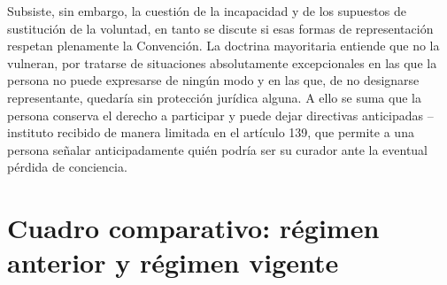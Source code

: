 \documentclass[12pt,oneside]{book}
\begin{document}
Subsiste, sin embargo, la cuestión de la incapacidad y de los supuestos de sustitución de la voluntad, en tanto se discute si esas formas de representación respetan plenamente la Convención. La doctrina mayoritaria entiende que no la vulneran, por tratarse de situaciones absolutamente excepcionales en las que la persona no puede expresarse de ningún modo y en las que, de no designarse representante, quedaría sin protección jurídica alguna. A ello se suma que la persona conserva el derecho a participar y puede dejar directivas anticipadas --instituto recibido de manera limitada en el artículo 139, que permite a una persona señalar anticipadamente quién podría ser su curador ante la eventual pérdida de conciencia.

\section{Cuadro comparativo: régimen anterior y régimen vigente}
\end{document}
